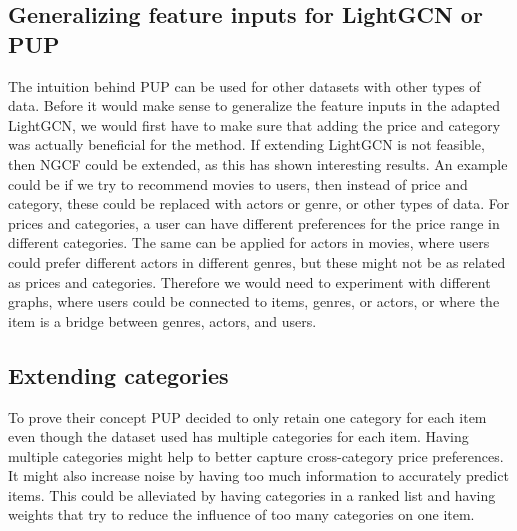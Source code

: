 \subsection{Generalizing feature inputs for LightGCN or PUP}
The intuition behind PUP can be used for other datasets with other types of data.
Before it would make sense to generalize the feature inputs in the adapted LightGCN, we would first have to make sure that adding the price and category was actually beneficial for the method.
If extending LightGCN is not feasible, then NGCF could be extended, as this has shown interesting results.
An example could be if we try to recommend movies to users, then instead of price and category, these could be replaced with actors or genre, or other types of data.
For prices and categories, a user can have different preferences for the price range in different categories.
The same can be applied for actors in movies, where users could prefer different actors in different genres, but these might not be as related as prices and categories.
Therefore we would need to experiment with different graphs, where users could be connected to items, genres, or actors, or where the item is a bridge between genres, actors, and users.

\subsection{Extending categories}
To prove their concept PUP decided to only retain one category for each item even though the dataset used has multiple categories for each item.
Having multiple categories might help to better capture cross-category price preferences.
It might also increase noise by having too much information to accurately predict items.
This could be alleviated by having categories in a ranked list and having weights that try to reduce the influence of too many categories on one item.
